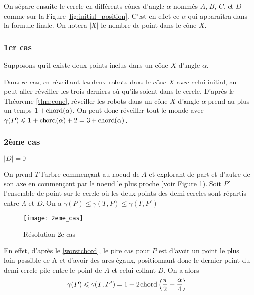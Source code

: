   On sépare ensuite le cercle en différents cônes d'angle $\alpha$ nommés $A$,
  $B$, $C$, et $D$ comme sur la Figure \ref{fig:initial_position}. C'est en
  effet ce $\alpha$ qui apparaîtra dans la formule finale. On notera $|X|$ le
  nombre de point dans le cône $X$.

\subsubsection*{1er cas}\label{1cas} Supposons qu'il existe deux points inclus
dans un cône $X$ d'angle $\alpha$.

Dans ce cas, en réveillant les deux robots dans le cône $X$ avec celui initial,
on peut aller réveiller les trois derniers où qu'ils soient dans le
cercle.  D'après le Théoreme \ref{thm:cone}, réveiller les robots dans
un cône $X$ d'angle $\alpha$ prend au plus un temps $1 + \operatorname{chord}(\alpha)$.  On
peut donc réveiller tout le monde avec
$\gamma(P) \leqslant 1 + \operatorname{chord}(\alpha) + 2 = 3 + \operatorname{chord}(\alpha)$.

\subsubsection*{2ème cas}\label{2cas} $|D| = 0$

On prend $T$ l'arbre commençant au noeud de $A$ et explorant de part et d'autre
de son axe en commençant par le noeud le plus proche (voir Figure \ref{fig:2eme_cas}).
Soit $P'$ l'ensemble de point sur le cercle où les deux points des demi-cercles sont répartis entre $A$ et $D$.
On a $\gamma(P) \leq  \gamma(T, P) \leq \gamma(T, P')$

\begin{figure}[h!]
  \centering
  \texttt{[image: 2eme\_cas]}
  \caption{Résolution 2e cas}
  \label{fig:2eme_cas}
\end{figure}

En effet, d'après le \cref{worstchord}, le pire cas pour $P$ est d'avoir un point le plus loin possible de A et d'avoir des arcs égaux, positionnant donc le dernier point du demi-cercle pile entre le point de $A$ et celui collant $D$. On a alors
$$\gamma(P) \leqslant \gamma(T, P') = 1 + 2\operatorname{chord}\left(\frac{\pi}{2} -
  \frac{\alpha}{4}\right)$$

